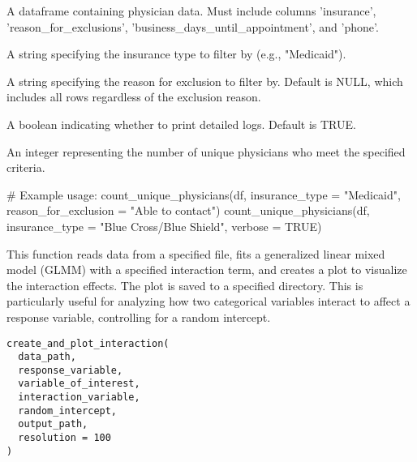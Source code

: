 \documentclass[a4paper]{book}
\begin{document}
%
\begin{Arguments}
\begin{ldescription}
\item[\code{df}] A dataframe containing physician data. Must include columns 'insurance', 'reason\_for\_exclusions', 'business\_days\_until\_appointment', and 'phone'.

\item[\code{insurance\_type}] A string specifying the insurance type to filter by (e.g., "Medicaid").

\item[\code{reason\_for\_exclusion}] A string specifying the reason for exclusion to filter by. Default is NULL, which includes all rows regardless of the exclusion reason.

\item[\code{verbose}] A boolean indicating whether to print detailed logs. Default is TRUE.
\end{ldescription}
\end{Arguments}
%
\begin{Value}
An integer representing the number of unique physicians who meet the specified criteria.
\end{Value}
%
\begin{Examples}
\begin{ExampleCode}
# Example usage:
count_unique_physicians(df, insurance_type = "Medicaid", reason_for_exclusion = "Able to contact")
count_unique_physicians(df, insurance_type = "Blue Cross/Blue Shield", verbose = TRUE)

\end{ExampleCode}
\end{Examples}
%
\begin{Description}
This function reads data from a specified file, fits a generalized linear mixed model (GLMM) with a specified interaction term, and creates a plot to visualize the interaction effects. The plot is saved to a specified directory. This is particularly useful for analyzing how two categorical variables interact to affect a response variable, controlling for a random intercept.
\end{Description}
%
\begin{Usage}
\begin{verbatim}
create_and_plot_interaction(
  data_path,
  response_variable,
  variable_of_interest,
  interaction_variable,
  random_intercept,
  output_path,
  resolution = 100
)
\end{verbatim}
\end{Usage}
\end{document}
